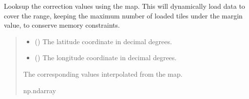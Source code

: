 \documentclass[letterpaper,10pt,english]{sphinxmanual}
\begin{document}
\begin{fulllineitems}
\begin{fulllineitems}
\label{\detokenize{modules/gravity/ggm_plus:qnav.gravity.ggm_plus.GGMPlusAcc.get_map_values}}
\pysigstartsignatures
{}
\pysigstopsignatures
\sphinxAtStartPar
Looks\sphinxhyphen{}up the correction values using the map.
This will dynamically load data to cover the range, keeping the
maximum number of loaded tiles under the margin value, to conserve
memory constraints.
\begin{quote}\begin{description}
\begin{itemize}
\item {} 
\sphinxAtStartPar
{} () \textendash{} The latitude coordinate in decimal degrees.

\item {} 
\sphinxAtStartPar
{} () \textendash{} The longitude coordinate in decimal degrees.

\end{itemize}

\sphinxAtStartPar
The corresponding values interpolated from the map.

\sphinxAtStartPar
np.ndarray

\end{description}\end{quote}

\end{fulllineitems}



\end{fulllineitems}
\end{document}
